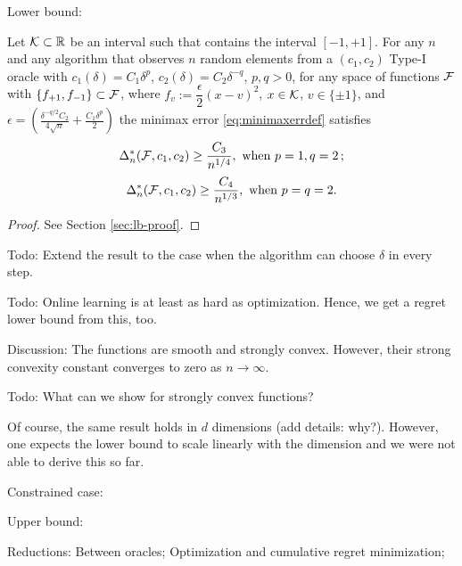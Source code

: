 Lower bound:
\begin{theorem}
Let $\mathcal{K}\subset \mathbb{R}$ be an interval such that contains the interval $[-1,+1]$.
 For any $n$ and any algorithm that observes $n$ random elements from a $(c_1,c_2)$ Type-I oracle 
 with $c_1(\delta) = C_1 \delta^p$, $c_2(\delta) = C_2 \delta^{-q}$, $p,q>0$,
 for any space of functions $\mathcal{F}$ with $\{f_{+1}, f_{-1} \}\subset \mathcal{F}$, 
 where $f_v:= \dfrac{\epsilon}{2} (x - v)^2$, $x\in \mathcal{K}$, $v\in \{\pm 1\}$,
and $\epsilon = \left(\frac{\delta^{-q/2}C_2}{4\sqrt{n}} + \frac{C_1\delta^p}{2}\right)$ 
 the minimax error \eqref{eq:minimaxerrdef} satisfies
\[
\Delta_n^*(\mathcal{F}, c_1,c_2) \ge \dfrac{C_3}{ n^{1/4}}, \text{ when } p=1, q=2\,; 
\]
 \[
 \Delta_n^*(\mathcal{F}, c_1,c_2) \ge \dfrac{C_4}{ n^{1/3}},  \text{ when } p=q=2.
 \]
\end{theorem}
\begin{proof}
 See Section \ref{sec:lb-proof}.
\end{proof}
Todo: Extend the result to the case when the algorithm can choose $\delta$ in every step.

Todo: Online learning is at least as hard as optimization. Hence, we get a regret lower bound from this, too.

Discussion: The functions are smooth and strongly convex.
However, their strong convexity constant converges to zero as $n\to\infty$.

Todo: What can we show for strongly convex functions?

Of course, the same result holds in $d$ dimensions (add details: why?). However, one expects the lower bound to scale linearly with the dimension and we were not able to derive this so far.

Constrained case:

Upper bound: 

Reductions:
Between oracles;
Optimization and cumulative regret minimization;



